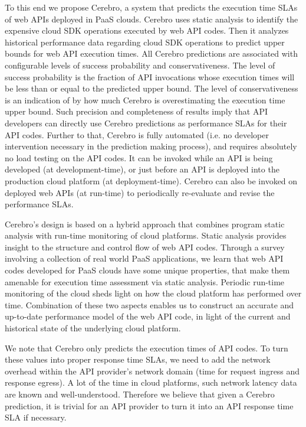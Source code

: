 To this end we propose Cerebro, a system that predicts the execution time SLAs of web APIs
deployed in PaaS clouds. Cerebro uses static analysis to identify the expensive cloud SDK operations
executed by web API codes. Then it analyzes historical performance data regarding cloud SDK
operations to predict upper bounds for web API execution times. All Cerebro predictions
are associated with configurable levels of success probability and conservativeness. The level of 
success probability is the fraction of API invocations whose execution times will be less than or equal to the
predicted upper bound. The level of conservativeness is an indication of by how much Cerebro
is overestimating the execution time upper bound. Such precision and completeness of results
imply that API developers can directly use Cerebro predictions as performance SLAs for their
API codes. Further to that, Cerebro is fully automated (i.e. no developer intervention necessary in
the prediction making process), and requires absolutely no load testing on the API codes. It can be
invoked while an API is being developed (at development-time), or just before an API is deployed
into the production cloud platform (at deployment-time). Cerebro can also be invoked on deployed
web APIs (at run-time) to periodically re-evaluate and revise the performance SLAs.

Cerebro's design is based on a hybrid approach that combines program static analysis with run-time
monitoring of cloud platforms. Static analysis provides insight to the structure and control flow of web
API codes. Through a survey involving a collection
of real world PaaS applications, we learn that web API codes developed for PaaS clouds have
some unique properties, that make them amenable for execution time assessment via static 
analysis. Periodic run-time monitoring of the cloud sheds light on how
the cloud platform has performed over time. Combination of these two aspects enables
us to construct an accurate and up-to-date performance model of the web API code, in light of the 
current and historical state of the underlying cloud platform. 

We note that Cerebro only predicts the
execution times of API codes. To turn these values into proper response time SLAs, we need to
add the network overhead within the API provider's network domain (time for request ingress
and response egress). A lot of the time in cloud platforms, such network latency data are
known and well-understood. Therefore we believe that given a Cerebro prediction, it is trivial
for an API provider to turn it into an API response time SLA if necessary.

